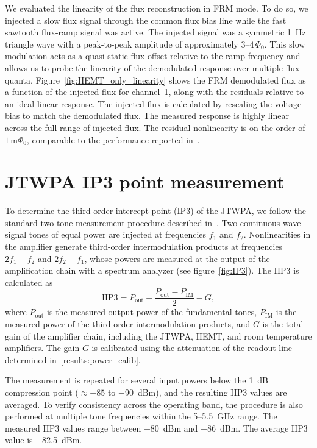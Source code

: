\documentclass[
 prd,
 reprint,
 superscriptaddress,
 amsmath,amssymb,
 aps,
 floatfix,
]{revtex4-2}
\begin{document}
We evaluated the linearity of the flux reconstruction in FRM mode. To do so, we injected a slow flux signal through the common flux bias line while the fast sawtooth flux-ramp signal was active. The injected signal was a symmetric \qty{1}{\Hz} triangle wave with a peak-to-peak amplitude of approximately $3$--$4\,\Phi_0$. This slow modulation acts as a quasi-static flux offset relative to the ramp frequency and allows us to probe the linearity of the demodulated response over multiple flux quanta. Figure~\ref{fig:HEMT_only_linearity} shows the FRM demodulated flux as a function of the injected flux for channel~1, along with the residuals relative to an ideal linear response. The injected flux is calculated by rescaling the voltage bias to match the demodulated flux. The measured response is highly linear across the full range of injected flux. The residual nonlinearity is on the order of $1\,\mathrm{m}\Phi_0$, comparable to the performance reported in~\cite{mates_flux-ramp_2012}.





\section{JTWPA IP3 point measurement} \label{appx:TWPA_IP3}

To determine the third-order intercept point (IP3) of the JTWPA, we follow the standard two-tone measurement procedure described in~\cite{analog_devices_ip3_2013}. Two continuous-wave signal tones of equal power are injected at frequencies $f_1$ and $f_2$. Nonlinearities in the amplifier generate third-order intermodulation products at frequencies $2f_1 - f_2$ and $2f_2 - f_1$, whose powers are measured at the output of the amplification chain with a spectrum analyzer (see figure~\ref{fig:IP3}). The IIP3 is calculated as
\begin{equation}
    \text{IIP3} = P_{\text{out}} - \frac{P_{\text{out}} - P_{\text{IM}}}{2} - G,
\end{equation}
where $P_{\text{out}}$ is the measured output power of the fundamental tones, $P_{\text{IM}}$ is the measured power of the third-order intermodulation products, and $G$ is the total gain of the amplifier chain, including the JTWPA, HEMT, and room temperature amplifiers. The gain $G$ is calibrated using the attenuation of the readout line determined in~\cref{results:power_calib}.

The measurement is repeated for several input powers below the \qty{1}{\dB} compression point ($\approx-85$ to \qty{-90}{dBm}), and the resulting IIP3 values are averaged. To verify consistency across the operating band, the procedure is also performed at multiple tone frequencies within the 5--\qty{5.5}{\GHz} range. The measured IIP3 values range between \qty{-80}{dBm} and \qty{-86}{dBm}. The average IIP3 value is \mbox{\qty{-82.5}{dBm}}. 
\end{document}
